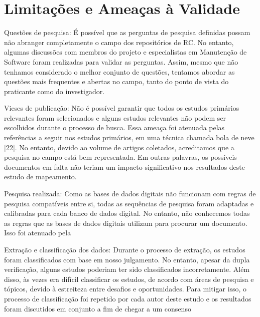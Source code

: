 \section{Limitações e Ameaças à Validade}
Questões de pesquisa: É possível que as perguntas de pesquisa definidas possam
não abranger completamente o campo dos repositórios de RC. No entanto, algumas
discussões com membros do projeto e especialistas em Manutenção de Software
foram realizadas para validar as perguntas. Assim, mesmo que não tenhamos
considerado o melhor conjunto de questões, tentamos abordar as questões mais
frequentes e abertas no campo, tanto do ponto de vista do praticante como do
investigador.

Vieses de publicação: Não é possível garantir que todos os estudos primários
relevantes foram selecionados e alguns estudos relevantes não podem ser
escolhidos durante o processo de busca. Essa ameaça foi atenuada pelas
referências a seguir nos estudos primários, em uma técnica chamada bola de neve
[22]. No entanto, devido ao volume de artigos coletados, acreditamos que a
pesquisa no campo está bem representada. Em outras palavras, os possíveis
documentos em falta não teriam um impacto significativo nos resultados deste
estudo de mapeamento.

Pesquisa realizada: Como as bases de dados digitais não funcionam com regras de
pesquisa compatíveis entre si, todas as sequências de pesquisa foram adaptadas e
calibradas para cada banco de dados digital. No entanto, não conhecemos todas as
regras que as bases de dados digitais utilizam para procurar um documento. Isso
foi atenuado pela

Extração e classificação dos dados: Durante o processo de extração, os estudos
foram classificados com base em nosso julgamento. No entanto, apesar da dupla
verificação, alguns estudos poderiam ter sido classificados incorretamente. Além
disso, às vezes era difícil classificar os estudos, de acordo com áreas de
pesquisa e tópicos, devido à estreiteza entre desafios e oportunidades. Para
mitigar isso, o processo de classificação foi repetido por cada autor deste
estudo e os resultados foram discutidos em conjunto a fim de chegar a um
consenso


